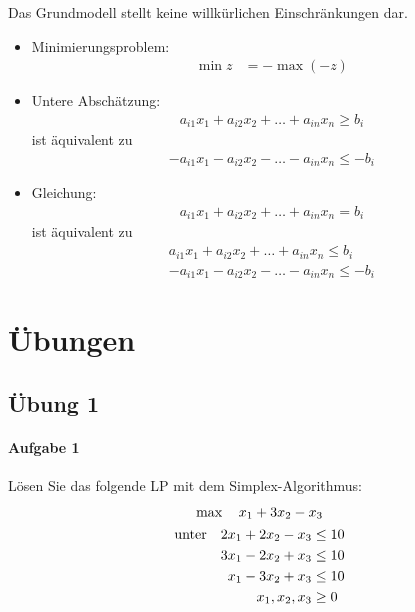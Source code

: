 \documentclass[
a4paper, %
11pt,
]
{scrartcl}
\begin{document}
Das Grundmodell stellt keine willkürlichen Einschränkungen dar.
\begin{itemize}
  \item Minimierungsproblem:
    \begin{align*}
      \min z & = - \max (-z)
    \end{align*}

  \item Untere Abschätzung:
    \begin{align*}
      a_{i1} x_1 + a_{i2} x_2 + \ldots + a_{in} x_n \geq b_i
    \end{align*}
    ist äquivalent zu
    \begin{align*}
      -a_{i1} x_1 - a_{i2} x_2 - \ldots - a_{in} x_n \leq -b_i
    \end{align*}

  \item Gleichung:
    \begin{align*}
      a_{i1} x_1 + a_{i2} x_2 + \ldots + a_{in} x_n = b_i
    \end{align*}
    ist äquivalent zu
    \begin{align*}
      a_{i1} x_1 + a_{i2} x_2 + \ldots + a_{in} x_n \leq b_i\\
      -a_{i1} x_1 - a_{i2} x_2 - \ldots - a_{in} x_n \leq -b_i
    \end{align*}

\end{itemize}

\section{Übungen}%
\label{sec:ubungen}

\subsection{Übung 1}%
\label{sub:ubung_1}

\paragraph{Aufgabe 1}%
\label{par:aufgabe_1}
Lösen Sie das folgende LP mit dem Simplex-Algorithmus:
\begin{gather*}
  \max \quad x_1 + 3 x_2 - x_3\\
  \begin{aligned}
    \textup{unter}
    \quad
    2 x_1 + 2 x_2 - x_3 & \leq 10\\
    3 x_1 - 2 x_2 + x_3 & \leq 10\\
    x_1   - 3 x_2 + x_3 & \leq 10\\
    x_1, x_2, x_3       & \geq 0
  \end{aligned}
\end{gather*}
\end{document}
